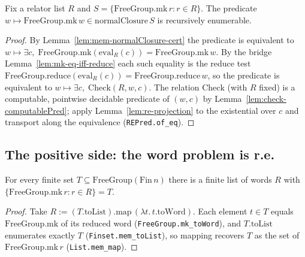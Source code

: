 \begin{lemma}
    \label{lem:re-mem-normalClosure}
    Fix a relator list $R$ and $S = \{\mathrm{FreeGroup.mk}\,r : r \in R\}$. The
    predicate $w \mapsto \mathrm{FreeGroup.mk}\,w \in \mathrm{normalClosure}\,S$
    is recursively enumerable.
\end{lemma}
\begin{proof}
    By Lemma~\ref{lem:mem-normalClosure-cert} the predicate is equivalent to
    $w \mapsto \exists c,\; \mathrm{FreeGroup.mk}(\mathrm{eval}_R(c)) =
    \mathrm{FreeGroup.mk}\,w$. By the bridge Lemma~\ref{lem:mk-eq-iff-reduce} each
    such equality is the reduce test
    $\mathrm{FreeGroup.reduce}(\mathrm{eval}_R(c)) = \mathrm{FreeGroup.reduce}\,w$,
    so the predicate is equivalent to $w \mapsto \exists c,\; \mathrm{Check}(R, w, c)$.
    The relation $\mathrm{Check}$ (with $R$ fixed) is a computable, pointwise
    decidable predicate of $(w, c)$ by Lemma~\ref{lem:check-computablePred}; apply
    Lemma~\ref{lem:re-projection} to the existential over $c$ and transport along
    the equivalence (\texttt{REPred.of\_eq}).
\end{proof}

\subsection{The positive side: the word problem is r.e.}

\begin{lemma}
    \label{lem:finset-to-word-list}
    \leanok
    For every finite set $T \subseteq \mathrm{FreeGroup}(\mathrm{Fin}\,n)$ there
    is a finite list of words $R$ with
    $\{\mathrm{FreeGroup.mk}\,r : r \in R\} = T$.
\end{lemma}
\begin{proof}
    Take $R := (T.\mathrm{toList}).\mathrm{map}\,(\lambda t.\, t.\mathrm{toWord})$.
    Each element $t \in T$ equals $\mathrm{FreeGroup.mk}$ of its reduced word
    (\texttt{FreeGroup.mk\_toWord}), and $T.\mathrm{toList}$ enumerates exactly
    $T$ (\texttt{Finset.mem\_toList}), so mapping recovers $T$ as the set of
    $\mathrm{FreeGroup.mk}\,r$ (\texttt{List.mem\_map}).
\end{proof}

